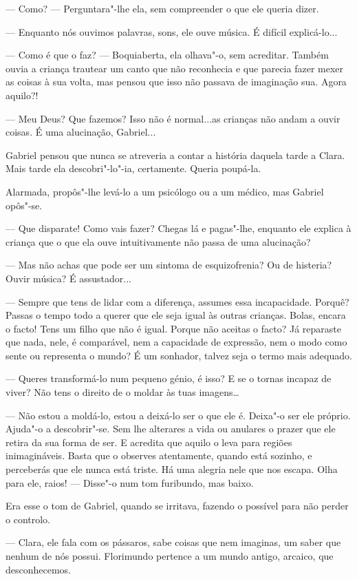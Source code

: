 --- Como? --- Perguntara"-lhe ela, sem compreender o que ele queria dizer.

--- Enquanto nós ouvimos palavras, sons, ele ouve música. É difícil
explicá-lo...

--- Como é que o faz? --- Boquiaberta, ela olhava"-o, sem acreditar. Também
ouvia a criança trautear um canto que não reconhecia e que parecia fazer
mexer as coisas à sua volta, mas pensou que isso não passava de
imaginação sua. Agora aquilo?!

--- Meu Deus? Que fazemos? Isso não é normal...as crianças não andam a
ouvir coisas. É uma alucinação, Gabriel...

Gabriel pensou que nunca se atreveria a contar a história daquela tarde
a Clara. Mais tarde ela descobri"-lo"-ia, certamente. Queria poupá-la.

Alarmada, propôs"-lhe levá-lo a um psicólogo ou a um médico, mas Gabriel
opôs"-se.

--- Que disparate! Como vais fazer? Chegas lá e pagas"-lhe, enquanto ele
explica à criança que o que ela ouve intuitivamente não passa de uma
alucinação?

--- Mas não achas que pode ser um sintoma de esquizofrenia? Ou de
histeria? Ouvir música? É assustador...

--- Sempre que tens de lidar com a diferença, assumes essa incapacidade.
Porquê? Passas o tempo todo a querer que ele seja igual às outras
crianças. Bolas, encara o facto! Tens um filho que não é igual. Porque
não aceitas o facto? Já reparaste que nada, nele, é comparável, nem a
capacidade de expressão, nem o modo como sente ou representa o mundo? É
um sonhador, talvez seja o termo mais adequado.

--- Queres transformá-lo num pequeno génio, é isso? E se o tornas incapaz
de viver? Não tens o direito de o moldar às tuas imagens\ldots{}

--- Não estou a moldá-lo, estou a deixá-lo ser o que ele é. Deixa"-o ser
ele próprio. Ajuda"-o a descobrir"-se. Sem lhe alterares a vida ou
anulares o prazer que ele retira da sua forma de ser. E acredita que
aquilo o leva para regiões inimagináveis. Basta que o observes
atentamente, quando está sozinho, e perceberás que ele nunca está
triste. Há uma alegria nele que nos escapa. Olha para ele, raios! ---
Disse"-o num tom furibundo, mas baixo.

Era esse o tom de Gabriel, quando se irritava, fazendo o possível para
não perder o controlo.

--- Clara, ele fala com os pássaros, sabe coisas que nem imaginas, um
saber que nenhum de nós possui. Florimundo pertence a um mundo antigo,
arcaico, que desconhecemos.

